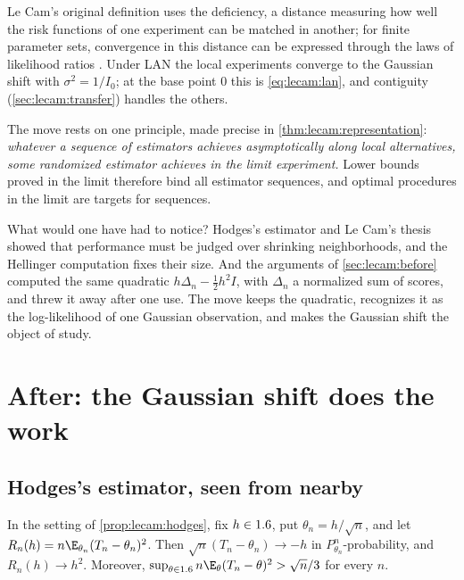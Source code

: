 \begin{refsection}
Le Cam's original definition uses the deficiency, a distance measuring how well the risk functions of one experiment can be matched in another; for finite parameter sets, convergence in this distance can be expressed through the laws of likelihood ratios \parencite{LeCam1986,vanderVaart1998}. Under LAN the local experiments converge to the Gaussian shift with $\sigma^2=1/I_0$; at the base point $0$ this is \eqref{eq:lecam:lan}, and contiguity (\cref{sec:lecam:transfer}) handles the others.

The move rests on one principle, made precise in \cref{thm:lecam:representation}: \emph{whatever a sequence of estimators achieves asymptotically along local alternatives, some randomized estimator achieves in the limit experiment.} Lower bounds proved in the limit therefore bind all estimator sequences, and optimal procedures in the limit are targets for sequences.

What would one have had to notice? Hodges's estimator and Le Cam's thesis showed that performance must be judged over shrinking neighborhoods, and the Hellinger computation fixes their size. And the arguments of \cref{sec:lecam:before} computed the same quadratic $h\Delta_n-\frac12h^2I$, with $\Delta_n$ a normalized sum of scores, and threw it away after one use. The move keeps the quadratic, recognizes it as the log-likelihood of one Gaussian observation, and makes the Gaussian shift the object of study.

\section{After: the Gaussian shift does the work}\label{sec:lecam:limit}

\subsection{Hodges's estimator, seen from nearby}

\begin{proposition}\label{prop:lecam:hodges-local}
In the setting of \cref{prop:lecam:hodges}, fix $h\in1.6$, put $\theta_n=h/\sqrt n$, and let $R_n(h)=n\E_{\theta_n}(T_n-\theta_n)^2$. Then $\sqrt n(T_n-\theta_n)\to-h$ in $P^n_{\theta_n}$-probability, and $R_n(h)\to h^2$. Moreover, $\sup_{\theta\in\R}n\E_\theta(T_n-\theta)^2>\sqrt n/3$ for every $n$.
\end{proposition}


\end{refsection}
